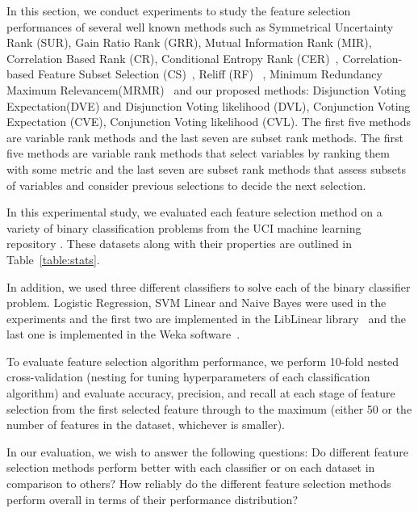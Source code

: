 In this section, we conduct experiments to study the feature selection
performances of several well known methods such as Symmetrical
Uncertainty Rank (SUR), Gain Ratio Rank (GRR), Mutual Information Rank
(MIR), Correlation Based Rank (CR), Conditional Entropy Rank (CER)~\cite{guyon_jmlr03}, Correlation-based Feature Subset Selection (CS)~\cite{Hall1998}, Reliff (RF)~\cite{Robnik-Sikonja2003} , Minimum Redundancy Maximum Relevancem(MRMR)~\cite{peng2005} and our proposed methods:  Disjunction Voting Expectation(DVE) and  Disjunction Voting likelihood (DVL), Conjunction Voting Expectation (CVE), Conjunction Voting likelihood (CVL). The first five methods are variable rank methods and the last seven are subset rank methods. The first five methods are variable rank methods that select variables by ranking them with some metric and the last seven are subset rank methods that assess subsets of variables and consider previous selections to decide the next selection.

In this experimental study, we evaluated each feature selection
method on a variety of binary classification problems 
from the UCI machine learning repository \cite{Bache+Lichman:2013}.
These datasets along with their properties are outlined in 
Table~\ref{table:stats}.

In addition, we used three different classifiers to solve each of the
binary classifier problem. Logistic Regression, SVM Linear and Naive
Bayes were used in the experiments and the first two are implemented
in the LibLinear library~\cite{REF08a} and the last one is implemented in
the Weka software~\cite{weka}.
 
To evaluate feature selection algorithm performance, we perform 
10-fold nested cross-validation (nesting for tuning hyperparameters of each classification
algorithm) and evaluate accuracy, precision, and recall at each stage of
feature selection from the first selected feature through to the maximum
(either 50 or the number of features in the dataset, whichever is smaller).

In our evaluation, we wish to answer the following questions:
Do different feature selection methods perform better with
each classifier or on each dataset in comparison to others?
How reliably do the different feature selection methods perform overall
in terms of their performance distribution?

